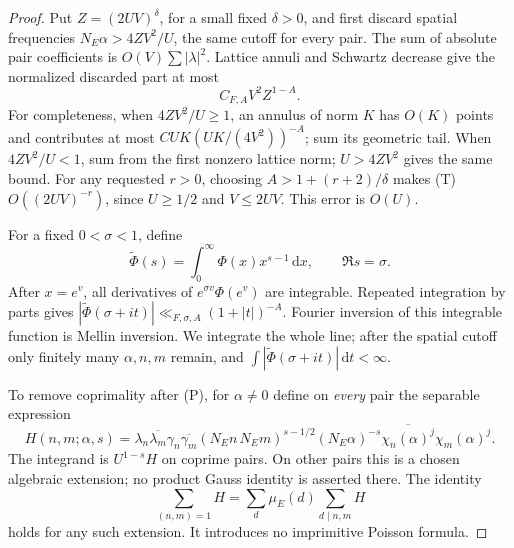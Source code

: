 \documentclass[11pt]{article}
\theoremstyle{remark}\newtheorem{remark}[theorem]{Remark}
\newcommand{\dd}{\,\mathrm d}
\begin{document}
\begin{proof}
Put $Z=(2UV)^\delta$, for a small fixed $\delta>0$, and first
discard spatial frequencies $N_E\alpha>4ZV^2/U$, the same cutoff
for every pair. The sum of absolute pair coefficients is
$O(V)\sum|\lambda|^2$. Lattice annuli and Schwartz decrease give
the normalized discarded part at most
\[
 C_{F,A}V^2Z^{1-A}.                              \tag{T}
\]
For completeness, when $4ZV^2/U\ge1$, an annulus of norm $K$
has $O(K)$ points and contributes at most
$CUK(UK/(4V^2))^{-A}$; sum its geometric tail.
When $4ZV^2/U<1$, sum from the first nonzero lattice norm;
$U>4ZV^2$ gives the same bound.
For any requested $r>0$, choosing
$A>1+(r+2)/\delta$ makes (T) $O((2UV)^{-r})$,
since $U\ge1/2$ and $V\le2UV$. This error is $O(U)$.

For a fixed $0<\sigma<1$, define
\[
 \widetilde\Phi(s)=\int_0^\infty\Phi(x)x^{s-1}\dd x,
 \qquad \Re s=\sigma.
\]
After $x=e^v$, all derivatives of $e^{\sigma v}\Phi(e^v)$
are integrable. Repeated integration by parts gives
$|\widetilde\Phi(\sigma+it)|\ll_{F,\sigma,A}(1+|t|)^{-A}$.
Fourier inversion of this integrable function is Mellin inversion.
We integrate the whole line; after the spatial cutoff only finitely
many $\alpha,n,m$ remain, and
$\int|\widetilde\Phi(\sigma+it)|\dd t<\infty$.

To remove coprimality after (P), for $\alpha\ne0$ define on
\emph{every} pair the
separable expression
\[
 H(n,m;\alpha,s)=\lambda_n\overline{\lambda_m}
  \gamma_n\overline{\gamma_m}(N_En\,N_Em)^{s-1/2}
  (N_E\alpha)^{-s}
  \overline{\chi_n(\alpha)^j}\chi_m(\alpha)^j.
\]
The integrand is $U^{1-s}H$ on coprime pairs. On other pairs this
is a chosen algebraic extension; no product Gauss identity is
asserted there. The identity
\[
 \sum_{(n,m)=1}H=\sum_d\mu_E(d)\sum_{d\mid n,m}H                 \tag{M}
\]
holds for any such extension. It introduces no imprimitive
Poisson formula.


\end{proof}
\end{document}
